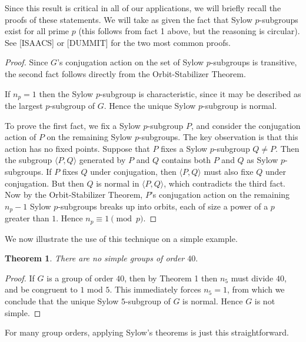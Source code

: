 \documentclass[11pt, oneside]{article}   	%
\newtheorem{theorem}{Theorem}
\begin{document}
Since this result is critical in all of our applications, we will briefly recall the proofs of these statements.  We will take as given the fact that Sylow $p$-subgroups exist for all prime $p$ (this follows from fact 1 above, but the reasoning is circular).  See [ISAACS] or [DUMMIT] for the two most common proofs.

\begin{proof}
Since $G$'s conjugation action on the set of Sylow $p$-subgroups is transitive, the second fact follows directly from the Orbit-Stabilizer Theorem.

If $n_p = 1$ then the Sylow $p$-subgroup is characteristic, since it may be described as the largest $p$-subgroup of $G$.  Hence the unique Sylow $p$-subgroup is normal.

To prove the first fact, we fix a Sylow $p$-subgroup $P$, and consider the conjugation action of $P$ on the remaining Sylow $p$-subgroups.  The key observation is that this action has no fixed points.  Suppose that $P$ fixes a Sylow $p$-subgroup $Q \neq P.$  Then the subgroup $\langle P, Q \rangle$ generated by $P$ and $Q$ contains both $P$ and $Q$ as Sylow $p$-subgroups.  If $P$ fixes $Q$ under conjugation, then $\langle P, Q \rangle$ must also fixe $Q$ under conjugation.  But then $Q$ is normal in $\langle P, Q \rangle$, which contradicts the third fact.
Now by the Orbit-Stabilizer Theorem, $P$'s conjugation action on the remaining $n_p - 1$ Sylow $p$-subgroups breaks up into orbits, each of size a power of a $p$ greater than $1$.  Hence $n_p \equiv 1 \pmod p.$
\end{proof}

We now illustrate the use of this technique on a simple example.

\begin{theorem}
There are no simple groups of order $40.$
\end{theorem}

\begin{proof}
If $G$ is a group of order $40$, then by Theorem 1 then $n_5$ must divide $40$, and be congruent to $1$ mod $5$.  This immediately forces $n_5 = 1$, from which we conclude that the unique Sylow $5$-subgroup of $G$ is normal.  Hence $G$ is not simple.
\end{proof}

For many group orders, applying Sylow's theorems is just this straightforward.

\end{document}
